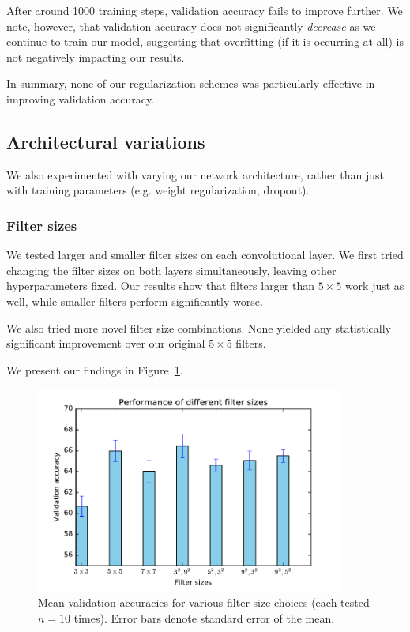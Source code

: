 \documentclass{article}
\begin{document}
\begin{multicols}{2}
After around 1000 training steps,
validation accuracy fails to improve further.
We note, however, that validation accuracy
does not significantly \emph{decrease}
as we continue to train our model,
suggesting that overfitting (if it is occurring at all)
is not negatively impacting our results.

In summary, none of our regularization schemes
was particularly effective in improving validation accuracy.



\subsection{Architectural variations}

We also experimented with varying our network architecture,
rather than just with training parameters
(e.g. weight regularization, dropout).


\subsubsection{Filter sizes}

We tested larger and smaller filter sizes
on each convolutional layer.
We first tried changing the filter sizes on both layers simultaneously,
leaving other hyperparameters fixed.
Our results show that filters larger than $5\times 5$
work just as well,
while smaller filters perform significantly worse.

We also tried more novel filter size combinations.
None yielded any statistically significant improvement
over our original $5\times 5$ filters.

We present our findings
in Figure~\ref{fig:filter-size-experiment}.

\begin{figure}[t]
   \centering
   \includegraphics[width=4in]{img/2-5-filter-size-acc.pdf} 
   \caption{Mean validation accuracies for various filter size choices (each tested $n=10$ times).
       Error bars denote standard error of the mean.}
   \label{fig:filter-size-experiment}
\end{figure}


\end{multicols}
\end{document}
